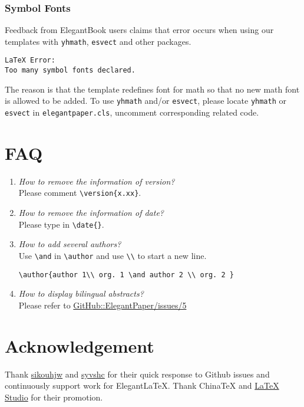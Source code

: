 \documentclass[lang=en,a4paper,bibend=bibtex]{elegantcs}
\begin{document}
\subsubsection{Symbol Fonts}
Feedback from ElegantBook users claims that error occurs when using our templates with  \lstinline{yhmath}, \lstinline{esvect} and other packages.
\begin{lstlisting}[style=Latex]
LaTeX Error:
Too many symbol fonts declared.
\end{lstlisting}

The reason is that the template redefines font for math so that no new math font is allowed to be added. To use \lstinline{yhmath} and/or \lstinline{esvect}, please locate \lstinline{yhmath} or \lstinline{esvect} in \lstinline{elegantpaper.cls}, uncomment corresponding related code.


\section{FAQ}

\begin{enumerate}[label=\arabic*).]
  \item \textit{How to remove the information of version?}\\
  Please comment \lstinline|\version{x.xx}|.
  \item \textit{How to remove the information of date?}\\
  Please type in \lstinline|\date{}|.
  \item \textit{How to add several authors?}\\
  Use \lstinline{\and} in \lstinline{\author} and use \lstinline{\\} to start a new line.
  \begin{lstlisting}[style=Latex]
  \author{author 1\\ org. 1 \and author 2 \\ org. 2 }
  \end{lstlisting}
  \item \textit{How to display bilingual abstracts?}\\
  Please refer to \href{https://github.com/ElegantLaTeX/ElegantPaper/issues/5}{GitHub::ElegantPaper/issues/5}
\end{enumerate}

\section{Acknowledgement}

Thank \href{https://github.com/sikouhjw}{sikouhjw} and \href{https://github.com/syvshc}{syvshc} for their quick response to Github issues and continuously support work for ElegantLaTeX. Thank ChinaTeX and \href{http://www.latexstudio.net/}{LaTeX Studio} for their promotion.



\printbibliography[heading=bibintoc, title=\ebibname]
\appendix
\addappheadtotoc
\end{document}
